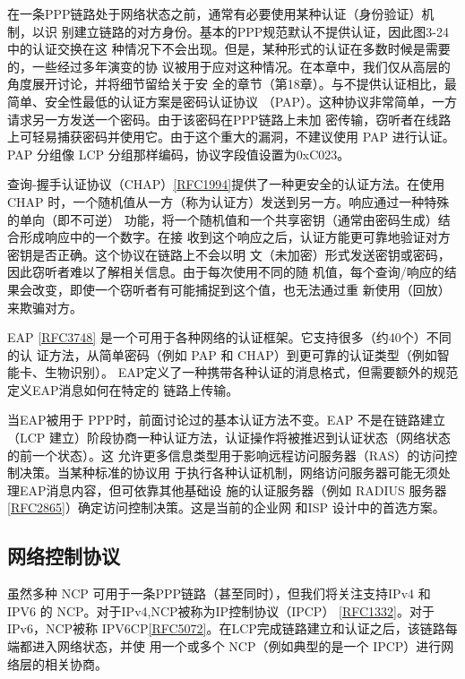 在一条PPP链路处于网络状态之前，通常有必要使用某种认证（身份验证）机制，以识
别建立链路的对方身份。基本的PPP规范默认不提供认证，因此图3-24中的认证交换在这
种情况下不会出现。但是，某种形式的认证在多数时候是需要的，一些经过多年演变的协
议被用于应对这种情况。在本章中，我们仅从高层的角度展开讨论，并将细节留给关于安
全的章节（第18章）。与不提供认证相比，最简单、安全性最低的认证方案是密码认证协议
（PAP）。这种协议非常简单，一方请求另一方发送一个密码。由于该密码在PPP链路上未加
密传输，窃听者在线路上可轻易捕获密码并使用它。由于这个重大的漏洞，不建议使用 PAP
进行认证。PAP 分组像 LCP 分组那样编码，协议字段值设置为0xC023。

查询-握手认证协议（CHAP）\href{https://www.rfc-editor.org/rfc/rfc1994}{[RFC1994]}提供了一种更安全的认证方法。在使用
CHAP
时，一个随机值从一方（称为认证方）发送到另一方。响应通过一种特殊的单向（即不可逆）
功能，将一个随机值和一个共享密钥（通常由密码生成）结合形成响应中的一个数字。在接
收到这个响应之后，认证方能更可靠地验证对方密钥是否正确。这个协议在链路上不会以明
文（未加密）形式发送密钥或密码，因此窃听者难以了解相关信息。由于每次使用不同的随
机值，每个查询/响应的结果会改变，即使一个窃听者有可能捕捉到这个值，也无法通过重
新使用（回放）来欺骗对方。

EAP \href{https://www.rfc-editor.org/rfc/rfc3748}{[RFC3748]}
是一个可用于各种网络的认证框架。它支持很多（约40个）不同的认
证方法，从简单密码（例如 PAP 和 CHAP）到更可靠的认证类型（例如智能卡、生物识别）。
EAP定义了一种携带各种认证的消息格式，但需要额外的规范定义EAP消息如何在特定的
链路上传输。

当EAP被用于 PPP时，前面讨论过的基本认证方法不变。EAP 不是在链路建立（LCP
建立）阶段协商一种认证方法，认证操作将被推迟到认证状态（网络状态的前一个状态）。这
允许更多信息类型用于影响远程访问服务器（RAS）的访问控制决策。当某种标准的协议用
于执行各种认证机制，网络访问服务器可能无须处理EAP消息内容，但可依靠其他基础设
施的认证服务器（例如 RADIUS
服务器\href{https://www.rfc-editor.org/rfc/rfc2865}{[RFC2865]}）确定访问控制决策。这是当前的企业网
和ISP 设计中的首选方案。

\subsection{网络控制协议}

虽然多种 NCP 可用于一条PPP链路（甚至同时），但我们将关注支持IPv4 和IPV6 的
NCP。对于IPv4,NCP被称为IP控制协议（IPCP）
\href{https://www.rfc-editor.org/rfc/rfc1332}{[RFC1332]}。对于 IPv6，NCP被称
IPV6CP\href{https://www.rfc-editor.org/rfc/rfc5072}{[RFC5072]}。在LCP完成链路建立和认证之后，该链路每端都进入网络状态，并使
用一个或多个 NCP（例如典型的是一个 IPCP）进行网络层的相关协商。

